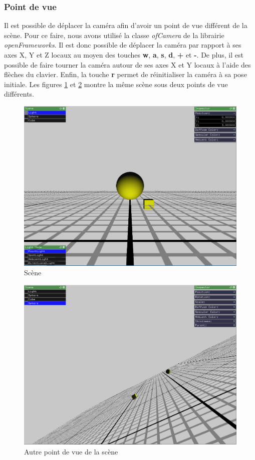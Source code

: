 \subsubsection{Point de vue}
\label{s:pov}
Il est possible de déplacer la caméra afin d'avoir un point de vue différent de la scène.
Pour ce faire, nous avons utilisé la classe \emph{ofCamera} de la librairie \emph{openFrameworks}.
Il est donc possible de déplacer la caméra par rapport à ses axes X, Y et Z locaux au moyen des touches \textbf{w}, \textbf{a}, \textbf{s}, \textbf{d}, \textbf{+} et \textbf{-}.
De plus, il est possible de faire tourner la caméra autour de ses axes X et Y locaux à l'aide des flèches du clavier.
Enfin, la touche \textbf{r} permet de réinitialiser la caméra à sa pose initiale.
Les figures \ref{fig:scenePOV1} et \ref{fig:scenePOV2} montre la même scène sous deux points de vue différents.

\begin{figure}[H]
    \centering
	\includegraphics[scale=0.25]{fig/scenePOV1.png}
	\caption{Scène}
	\label{fig:scenePOV1}
\end{figure}

\begin{figure}[H]
    \centering
	\includegraphics[scale=0.22]{fig/scenePOV2.png}
	\caption{Autre point de vue de la scène}
	\label{fig:scenePOV2}
\end{figure}

